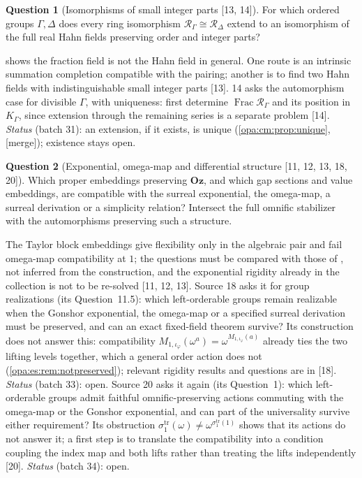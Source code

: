 \documentclass[11pt,oneside]{article}
\numberwithin{equation}{section}
\theoremstyle{definition}
\newtheorem{question}[question]{Question}
\theoremstyle{remark}
\newcommand{\Oz}{\mathbf{Oz}}
\newcommand{\Frac}{\operatorname{Frac}}
\newcommand{\src}[1]{\textup{\textsf{\small[#1]}}}
\newcommand{\mergetag}{\textup{\textsf{\small[merge]}}}
\begin{document}
\begin{question}[Isomorphisms of small integer parts \src{13, 14}]\label{opa:as:q:smallparts}
For which ordered groups $\Gamma,\Delta$ does every ring isomorphism $\mathcal R_\Gamma\cong\mathcal R_\Delta$ extend to
an isomorphism of the full real Hahn fields preserving order and integer parts?
\end{question}
 shows the fraction field is not the Hahn field in general. One route is an intrinsic
summation completion compatible with the pairing; another is to find two Hahn fields with indistinguishable small
integer parts \src{13}. 14 asks the automorphism case for divisible $\Gamma$, with uniqueness: first determine
$\Frac\mathcal R_\Gamma$ and its position in $K_\Gamma$, since extension through the remaining series is a separate
problem \src{14}. \emph{Status} (batch 31): an extension, if it exists, is unique (\cref{opa:cm:prop:unique},
\mergetag); existence stays open.

\begin{question}[Exponential, omega-map and differential structure \src{11, 12, 13, 18, 20}]\label{opa:as:q:exp}
Which proper embeddings preserving $\Oz$, and which gap sections and value embeddings, are compatible with the surreal
exponential, the omega-map, a surreal derivation or a simplicity relation? Intersect the full omnific stabilizer with the
automorphisms preserving such a structure.
\end{question}
The Taylor block embeddings give flexibility only in the algebraic pair and fail omega-map compatibility at $1$; the
questions must be compared with those of \cite{KKS}, not inferred from the construction, and the exponential rigidity
already in the collection is not to be re-solved \src{11, 12, 13}. Source 18 asks it for group realizations (its
Question~11.5): which left-orderable groups remain realizable when the Gonshor exponential, the omega-map or a specified
surreal derivation must be preserved, and can an exact fixed-field theorem survive? Its construction does not answer this:
compatibility $M_{1,\iota_\varphi}(\omega^a)=\omega^{M_{1,\iota_\varphi}(a)}$ already ties the two lifting levels together, which a general order
action does not (\cref{opa:es:rem:notpreserved}); relevant rigidity results and questions are in \cite{KKS} \src{18}.
\emph{Status} (batch 33): open. Source 20 asks it again (its Question~1): which left-orderable groups admit faithful
omnific-preserving actions commuting with the omega-map or the Gonshor exponential, and can part of the universality survive
either requirement? Its obstruction $\sigma^{\mathrm{tr}}_1(\omega)\ne\omega^{\sigma^{\mathrm{tr}}_1(1)}$ shows that its actions do not
answer it; a first step is to translate the compatibility into a condition coupling the index map and both lifts rather than treating
the lifts independently \src{20}. \emph{Status} (batch 34): open.
\end{document}
